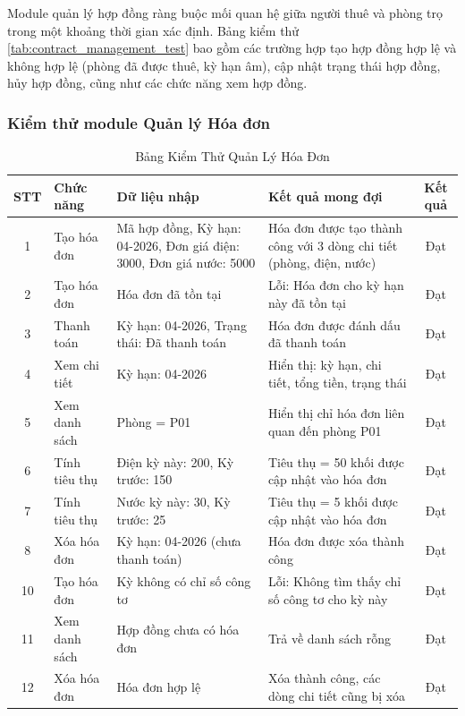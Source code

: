 Module quản lý hợp đồng ràng buộc mối quan hệ giữa người thuê và phòng trọ trong một khoảng thời gian xác định. Bảng kiểm thử \ref{tab:contract_management_test} bao gồm các trường hợp tạo hợp đồng hợp lệ và không hợp lệ (phòng đã được thuê, kỳ hạn âm), cập nhật trạng thái hợp đồng, hủy hợp đồng, cũng như các chức năng xem hợp đồng.

\subsubsection{Kiểm thử module Quản lý Hóa đơn}

\begin{table}[H]
    \centering
    \caption{Bảng Kiểm Thử Quản Lý Hóa Đơn}
    \label{tab:invoice_management_test}
    \vspace{2mm}
    \begin{small}
    \begin{tabularx}{\textwidth}{|c|l|X|X|c|}
    \hline
    \textbf{STT} & \textbf{Chức năng} & \textbf{Dữ liệu nhập} & \textbf{Kết quả mong đợi} & \textbf{Kết quả} \\ \hline
    1 & Tạo hóa đơn & Mã hợp đồng, Kỳ hạn: 04-2026, Đơn giá điện: 3000, Đơn giá nước: 5000 & Hóa đơn được tạo thành công với 3 dòng chi tiết (phòng, điện, nước) & Đạt \\ \hline
    2 & Tạo hóa đơn & Hóa đơn đã tồn tại & Lỗi: Hóa đơn cho kỳ hạn này đã tồn tại & Đạt \\ \hline
    3 & Thanh toán & Kỳ hạn: 04-2026, Trạng thái: Đã thanh toán & Hóa đơn được đánh dấu đã thanh toán & Đạt \\ \hline
    4 & Xem chi tiết & Kỳ hạn: 04-2026 & Hiển thị: kỳ hạn, chi tiết, tổng tiền, trạng thái & Đạt \\ \hline
    5 & Xem danh sách & Phòng = P01 & Hiển thị chỉ hóa đơn liên quan đến phòng P01 & Đạt \\ \hline
    6 & Tính tiêu thụ & Điện kỳ này: 200, Kỳ trước: 150 & Tiêu thụ = 50 khối được cập nhật vào hóa đơn & Đạt \\ \hline
    7 & Tính tiêu thụ & Nước kỳ này: 30, Kỳ trước: 25 & Tiêu thụ = 5 khối được cập nhật vào hóa đơn & Đạt \\ \hline
    8 & Xóa hóa đơn & Kỳ hạn: 04-2026 (chưa thanh toán) & Hóa đơn được xóa thành công & Đạt \\ \hline
    10 & Tạo hóa đơn & Kỳ không có chỉ số công tơ & Lỗi: Không tìm thấy chỉ số công tơ cho kỳ này & Đạt \\ \hline
    11 & Xem danh sách & Hợp đồng chưa có hóa đơn & Trả về danh sách rỗng & Đạt \\ \hline
    12 & Xóa hóa đơn & Hóa đơn hợp lệ & Xóa thành công, các dòng chi tiết cũng bị xóa & Đạt \\ \hline
    \end{tabularx}
    \end{small}
\end{table}


